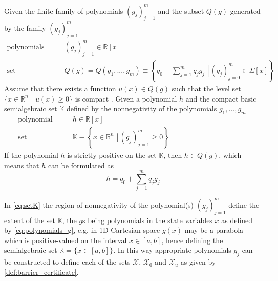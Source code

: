  
\vspace{-2mm}
\begin{thm}\label{def:putinar}
Given the finite family of polynomials $(g_j)_{j=1}^m$ and the subset $Q(g)$ %
generated by the family $(g_j)_{j=1}^m$ \citep[p 29]{bib:sos_putinar_lasserre}
\begin{subequations}\label{eq:putinar}
\begin{align}
\text{polynomials} \qquad & (g_j)_{j=1}^m \in\mathbb{R}[x]\label{eq:polynomials_g}\\
\text{set} \qquad & Q(g)=Q(g_1,...,g_m)\equiv\left\{\left.q_0+\sum\limits_{j=1}^{m}q_jg_j\,\,\right| \, (q_j)_{j=0}^m\in\Sigma[x]\right\}\label{eq:putinar_set_sos}
\end{align}
\end{subequations}
Assume that there exists a function $u(x)\in Q(g)$ such that the level set $\{x\in\mathbb{R}^n \,\,|\,\, u(x)\geq 0\}$ is compact \citep[p 29]{bib:sos_putinar_lasserre}.
Given a polynomial $h$ and the compact basic semialgebraic set $\mathbb{K}$  defined by the nonnegativity of the polynomials $g_1,\dots, g_m$  
\begin{subequations}
\begin{align}
\text{polynomial} \qquad & h \in\mathbb{R}[x]\\
\text{set} \qquad & \mathbb{K}\equiv\left\{\left.x\in \mathbb{R}^n\,\, \right| \, (g_j)_{j=1}^m\geq0\right\}\qquad\qquad\qquad\qquad\qquad\quad\label{eq:setK}
\end{align}
\end{subequations}
If the polynomial $h$ is strictly positive on the set $\mathbb{K}$, then $h\in Q(g)$, which means that $h$  can be formulated as
\begin{equation}\label{eq:sos_barrier}
h = q_0+\sum\limits_{j=1}^{m}q_jg_j
\end{equation}
\end{thm}

\vspace{-14mm}


In \autoref{eq:setK} the region of nonnegativity of the polynomial(s) $(g_j)_{j=1}^m$ define the extent of the set $\mathbb{K}$, the $g$s being  polynomials in the state variables $x$ as defined by \autoref{eq:polynomials_g}, e.g. in 1D Cartesian space $g(x)$ may be a parabola which is positive-valued on the interval $x\in[a,b]$, hence defining the semialgebraic set $\mathbb{K}=\{x\in[a,b]\}$. In this way appropriate polynomials $g_j$ can be constructed  to define each of the sets $\mathcal{X}$, $\mathcal{X}_0$ and $\mathcal{X}_u$ as given by \autoref{def:barrier_certificate}.

